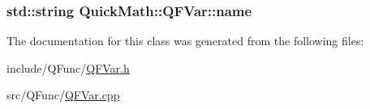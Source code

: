 \subsubsection[{name}]{\setlength{\rightskip}{0pt plus 5cm}std\+::string Quick\+Math\+::\+Q\+F\+Var\+::name\hspace{0.3cm}{\ttfamily [private]}}\label{classQuickMath_1_1QFVar_a39703d5b8aa86d92e22b344e92ccfd77}


The documentation for this class was generated from the following files\+:\begin{DoxyCompactItemize}
\item 
include/\+Q\+Func/\hyperlink{QFVar_8h}{Q\+F\+Var.\+h}\item 
src/\+Q\+Func/\hyperlink{QFVar_8cpp}{Q\+F\+Var.\+cpp}\end{DoxyCompactItemize}
